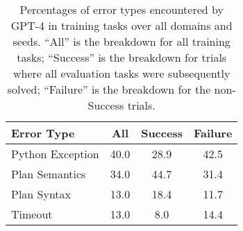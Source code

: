 \begin{table}[t]
\centering
\begin{tabular}{lccc} 
 \toprule
 \textbf{Error Type} & All & Success & Failure \\
 \midrule
 Python Exception & 40.0 & 28.9 & 42.5 \\
 Plan Semantics & 34.0 & 44.7 & 31.4 \\
 Plan Syntax & 13.0 & 18.4 & 11.7 \\
 Timeout & 13.0 & 8.0 & 14.4 \\
 \bottomrule
\end{tabular}
\caption{Percentages of error types encountered by GPT-4 in training tasks over all domains and seeds. ``All'' is the breakdown for all training tasks; ``Success'' is the breakdown for trials where all evaluation tasks were subsequently solved; ``Failure'' is the breakdown for the non-Success trials.}
\label{table:error_types}
\end{table}

